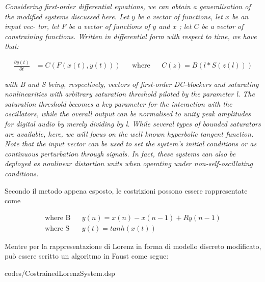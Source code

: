 \begin{center}
    \vspace{0.5cm}
    \textit{Considering first-order differential equations, 
we can obtain a generalisation of the modified systems discussed
here. Let \( y \) be a vector of functions, let \( x \) be an input vec-
tor, let \( F \) be a vector of functions of \( y \) and \( x \) ; let  \( C \) be
a vector of constraining functions. Written in differential
form with respect to time, we have that:}
\begin{center}
\begin{align*}
    \frac{\partial y(t)}{\partial t} & = C(F(x(t), y(t))) && \text{where} && C(z) = B(l * S(z(l)))
\end{align*}
\end{center}
    \textit{with B and S being, respectively, vectors of first-order
    DC-blockers and saturating nonlinearities with arbitrary
    saturation threshold piloted by the parameter l. The saturation threshold 
    becomes a key parameter for the interaction with the oscillators, while the overall output can be
    normalised to unity peak amplitudes for digital audio by
    merely dividing by l. While several types of bounded saturators are available, here, 
    we will focus on the well known 
    hyperbolic tangent function. Note that the input
    vector can be used to set the system’s initial conditions or
    as continuous perturbation through signals. In fact, these
    systems can also be deployed as nonlinear distortion units
    when operating under non-self-oscillating conditions.}
    \vspace{0.5cm}
\end{center}

Secondo il metodo appena esposto, le costrizioni possono essere rappresentate come

\begin{align*}
    \text{where B} && y(n) = x(n) -x(n-1) +Ry(n-1) \\
    \text{where S} && y(t) = tanh(x(t))
\end{align*}

Mentre per la rappresentazione di Lorenz in forma di modello discreto modificato,
può essere scritto un algoritmo in Faust come segue:

\vspace{0.5cm} 

{codes/CostrainedLorenzSystem.dsp}

